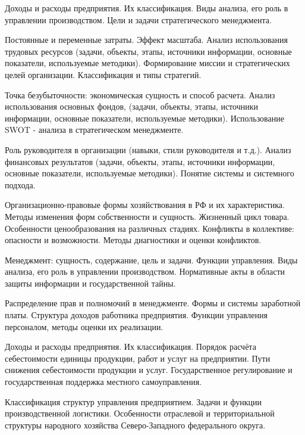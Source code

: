 \documentclass[
	11pt,
	a4paper,
	]
	{article}
\begin{document}
\bigskip

\noindent{} 
	{
		Доходы и расходы предприятия. Их классификация.
	}{
		Виды анализа, его роль в управлении производством.
	}{
		Цели и задачи стратегического менеджмента.
	}

\bigskip

\noindent{} 
	{
		Постоянные и переменные затраты. Эффект масштаба.
	}{
		Анализ использования трудовых ресурсов (задачи, объекты, этапы, источники информации, основные показатели, используемые методики).
	}{
		Формирование миссии и стратегических целей организации. Классификация и типы стратегий.
	}

\bigskip

\noindent{} 
	{
		Точка безубыточности: экономическая сущность и способ расчета.
	}{
		Анализ использования основных фондов, (задачи, объекты, этапы, источники информации, основные показатели, используемые методики).
	}{
		Использование SWOT - анализа в стратегическом менеджменте.
	}

\bigskip

\noindent{} 
	{
		Роль руководителя в организации (навыки, стили руководителя и т.д.).
	}{
		Анализ финансовых результатов (задачи, объекты, этапы, источники информации, основные показатели, используемые методики).
	}{
		Понятие системы и системного подхода.
	}

\bigskip

\noindent{} 
	{
		Организационно-правовые формы хозяйствования в РФ и их характеристика. Методы изменения форм собственности и сущность.
	}{
		Жизненный цикл товара. Особенности ценообразования на различных стадиях.
	}{
		Конфликты в коллективе: опасности и возможности. Методы диагностики и оценки конфликтов.
	}

\bigskip

\noindent{} 
	{
		Менеджмент: сущность, содержание, цель и задачи. Функции управления.
	}{
		Виды анализа, его роль в управлении производством.
	}{
		Нормативные акты в области защиты информации и государственной тайны.
	}

\bigskip

\noindent{} 
	{
		Распределение прав и полномочий в менеджменте.
	}{
		Формы и системы заработной платы. Структура доходов работника предприятия.
	}{
		Функции управления персоналом, методы оценки их реализации.
	}

\bigskip

\noindent{} 
	{
		Доходы и расходы предприятия. Их классификация.
	}{
		Порядок расчёта себестоимости единицы продукции, работ и услуг на предприятии. Пути снижения себестоимости продукции и услуг.
	}{
		Государственное регулирование и государственная поддержка местного самоуправления.
	}

\bigskip

\noindent{} 
	{
		Классификация структур управления предприятием.
	}{
		Задачи и функции производственной логистики.
	}{
		Особенности отраслевой и территориальной структуры народного хозяйства Северо-Западного федерального округа.
	}

\bigskip
\end{document}
